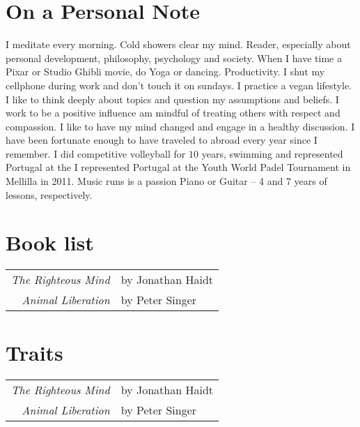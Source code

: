 \section{On a Personal Note}

I meditate every morning. Cold showers clear my mind. Reader, especially about personal development, philosophy, psychology and society. When I have time a Pixar or Studio Ghibli movie, do Yoga or dancing. Productivity. I shut my cellphone during work and don't touch it on sundays. I practice a vegan lifestyle. I like to think deeply about topics and question my assumptions and beliefs. I work to be a positive influence am mindful of treating others with respect and compassion. I like to have my mind changed and engage in a healthy discussion. I have been fortunate enough to have traveled to abroad every year since I remember. I did competitive volleyball for $10$ years, swimming and represented Portugal at the I represented Portugal at the Youth World Padel Tournament in Mellilla in 2011. Music runs is a passion Piano or Guitar – 4 and 7 years of lessons, respectively.\\

\section{Book list}

\begin{tabular}{rp{10cm}}

\emph{The Righteous Mind} & by Jonathan Haidt \\

\emph{Animal Liberation} & by Peter Singer \\

\end{tabular}

\section{Traits}

\begin{tabular}{rp{10cm}}

\emph{The Righteous Mind} & by Jonathan Haidt \\

\emph{Animal Liberation} & by Peter Singer \\

\end{tabular}
